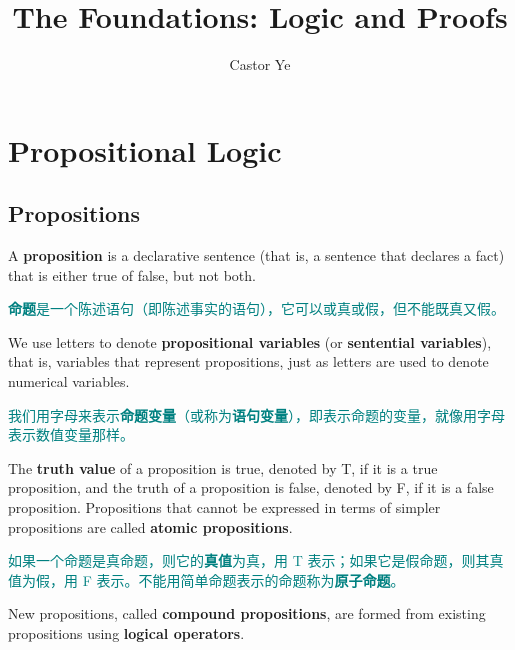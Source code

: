 \documentclass[12pt, a4paper]{article} %
\title{The Foundations: Logic and Proofs} %
\author{Castor Ye} %
\date{} %
\begin{document}
\maketitle %
\newtheorem{definition}{Definition}
\newtheorem{theorem}{定义}
\newtheorem{example}{Example}
\newtheorem{solution}{Solution}
\renewcommand{\figurename}{Figure} %
\renewcommand{\tablename}{Table} %
\section{Propositional Logic}
\subsection{Propositions}

A \textbf{proposition} is a declarative sentence (that is, a sentence that declares a fact) that is either true of false, but not both.

\textcolor{teal}{\textbf{命题}是一个陈述语句（即陈述事实的语句），它可以或真或假，但不能既真又假。}

We use letters to denote \textbf{propositional variables} (or \textbf{sentential variables}), that is, variables that represent propositions, just as letters are used to denote numerical variables.

\textcolor{teal}{我们用字母来表示\textbf{命题变量}（或称为\textbf{语句变量}），即表示命题的变量，就像用字母表示数值变量那样。}

The \textbf{truth value} of a proposition is true, denoted by T, if it is a true proposition, and the truth of a proposition is false, denoted by F, if it is a false proposition. Propositions that cannot be expressed in terms of simpler propositions are called \textbf{atomic propositions}.

\textcolor{teal}{如果一个命题是真命题，则它的\textbf{真值}为真，用 T 表示；如果它是假命题，则其真值为假，用 F 表示。不能用简单命题表示的命题称为\textbf{原子命题}。}

New propositions, called \textbf{compound propositions}, are formed from existing propositions using \textbf{logical operators}.
\end{document}
